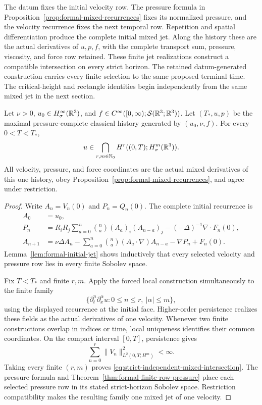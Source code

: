 The datum fixes the initial velocity row. The pressure formula in
Proposition~\ref{prop:formal-mixed-recurrences} fixes its normalized pressure,
and the velocity recurrence fixes the next temporal row. Repetition and
spatial differentiation produce the complete initial mixed jet. Along the
history these are the actual derivatives of \(u,p,f\), with the complete
transport sum, pressure, viscosity, and force row retained. These finite jet
realizations construct a compatible intersection on every strict horizon.
The retained datum-generated construction carries every finite selection to
the same proposed terminal time. The critical-height and rectangle identities
begin independently from the same mixed jet in the next section.

\begin{theorem}
\label{thm:strict-datum-intersection}
Let \(\nu>0\), \(u_0\in H^\infty_\sigma(\mathbb R^3)\), and
\(f\in C^\infty([0,\infty);\mathcal S(\mathbb R^3;\mathbb R^3))\). Let
\((T_*,u,p)\) be the maximal pressure-complete classical history generated
by \((u_0,\nu,f)\). For every \(0<T<T_*\),
\begin{equation}
 u\in\bigcap_{r,m\in\mathbb N_0}H^r((0,T);H^m_\sigma(\mathbb R^3)).
 \label{eq:strict-independent-mixed-intersection}
\end{equation}
All velocity, pressure, and force coordinates are the actual mixed
derivatives of this one history, obey
Proposition~\ref{prop:formal-mixed-recurrences}, and agree under restriction.
\end{theorem}

\begin{proof}
Write \(A_n=V_n(0)\) and \(P_n=Q_n(0)\). The complete initial recurrence is
\[
 \begin{aligned}
 A_0&=u_0,\\
 P_n&=R_iR_j\sum_{a=0}^n\binom na(A_a)_i(A_{n-a})_j
      -(-\Delta)^{-1}\nabla\cdot F_n(0),\\
 A_{n+1}&=\nu\Delta A_n
 -\sum_{a=0}^n\binom na(A_a\cdot\nabla)A_{n-a}
 -\nabla P_n+F_n(0).
 \end{aligned}
\]
Lemma~\ref{lem:formal-initial-jet} shows inductively that every selected
velocity and pressure row lies in every finite Sobolev space.

Fix \(T<T_*\) and finite \(r,m\). Apply the forced local construction
simultaneously to the finite family
\[
 \bigl\{\partial_t^n\partial_x^\alpha u:
 0\le n\le r,\ |\alpha|\le m\bigr\},
\]
using the displayed recurrence at the initial face. Higher-order persistence
realizes these fields as the actual derivatives of one velocity. Whenever
two finite constructions overlap in indices or time, local uniqueness
identifies their common coordinates. On the compact interval \([0,T]\),
persistence gives
\[
 \sum_{n=0}^r\|V_n\|_{L^2(0,T;H^m)}^2<\infty.
\]
Taking every finite \((r,m)\) proves
\eqref{eq:strict-independent-mixed-intersection}. The pressure formula and
Theorem~\ref{thm:formal-finite-row-pressure} place each selected pressure row
in its stated strict-horizon Sobolev space. Restriction compatibility makes
the resulting family one mixed jet of one velocity.
\end{proof}

